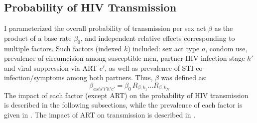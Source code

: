 \subsection{Probability of HIV Transmission}\label{model.par.beta}
I parameterized the overall probability of transmission per sex act $\beta$ as
the product of a base rate $\beta_0$,
and independent relative effects corresponding to multiple factors.
Such factors (indexed $k$) included:
sex act type $a$, condom use, prevalence of circumcision among susceptible men,
partner HIV infection stage $h'$ and viral suppression via ART $c'$,
as well as prevalence of STI co-infection/symptoms among both partners.
Thus, $\beta$ was defined as:
\begin{equation}\label{eq:model.beta}
  \beta_{asis'i'h'c'} = \beta_0 \, R_{\beta,k_1} \dots R_{\beta,k_N}
\end{equation}
The impact of each factor (except ART) on the probability of HIV transmission
is described in the following subsections,
while the prevalence of each factor is given in .
The impact of ART on transmission is described in .
